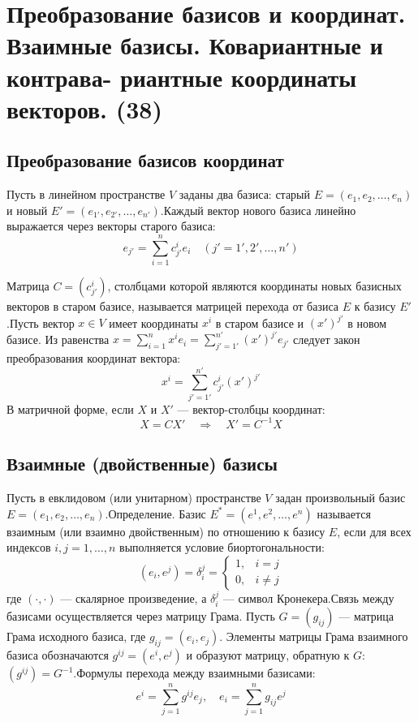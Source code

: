 \documentclass[14pt]{extreport}
\begin{document}
    \chapter{Преобразование базисов и координат. Взаимные базисы. Ковариантные и контрава-
риантные координаты векторов. (38)}

    \section{Преобразование базисов координат}
    Пусть в линейном пространстве $V$ заданы два базиса: старый $E = (e_1, e_2, \dots, e_n)$ и новый $E' = (e_{1'}, e_{2'}, \dots, e_{n'})$.Каждый вектор нового базиса линейно выражается через векторы старого базиса:$$e_{j'} = \sum_{i=1}^n c_{j'}^i e_i \quad (j' = 1', 2', \dots, n')$$

    Матрица $C = (c_{j'}^i)$, столбцами которой являются координаты новых базисных векторов в старом базисе, называется матрицей перехода от базиса $E$ к базису $E'$.Пусть вектор $x \in V$ имеет координаты $x^i$ в старом базисе и $(x')^{j'}$ в новом базисе. Из равенства $x = \sum_{i=1}^n x^i e_i = \sum_{j'=1'}^{n'} (x')^{j'} e_{j'}$ следует закон преобразования координат вектора:$$x^i = \sum_{j'=1'}^{n'} c_{j'}^i (x')^{j'}$$В матричной форме, если $X$ и $X'$ — вектор-столбцы координат:$$X = C X' \quad \Longrightarrow \quad X' = C^{-1} X$$

    \section{Взаимные (двойственные) базисы}

    Пусть в евклидовом (или унитарном) пространстве $V$ задан произвольный базис $E = (e_1, e_2, \dots, e_n)$.Определение. Базис $E^* = (e^1, e^2, \dots, e^n)$ называется взаимным (или взаимно двойственным) по отношению к базису $E$, если для всех индексов $i, j = 1, \dots, n$ выполняется условие биортогональности:$$(e_i, e^j) = \delta_i^j = \begin{cases} 1, & i = j \\ 0, & i \neq j \end{cases}$$где $(\cdot, \cdot)$ — скалярное произведение, а $\delta_i^j$ — символ Кронекера.Связь между базисами осуществляется через матрицу Грама. Пусть $G = (g_{ij})$ — матрица Грама исходного базиса, где $g_{ij} = (e_i, e_j)$. Элементы матрицы Грама взаимного базиса обозначаются $g^{ij} = (e^i, e^j)$ и образуют матрицу, обратную к $G$: $(g^{ij}) = G^{-1}$.Формулы перехода между взаимными базисами:$$e^i = \sum_{j=1}^n g^{ij} e_j, \quad e_i = \sum_{j=1}^n g_{ij} e^j$$
\end{document}
